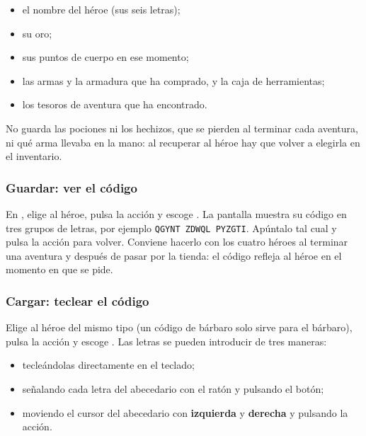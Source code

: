 \begin{itemize}
\item el nombre del héroe (sus seis letras);
\item su oro;
\item sus puntos de cuerpo en ese momento;
\item las armas y la armadura que ha comprado, y la caja de herramientas;
\item los tesoros de aventura que ha encontrado.
\end{itemize}

No guarda las pociones ni los hechizos, que se pierden al terminar cada
aventura, ni qué arma llevaba en la mano: al recuperar al héroe hay que
volver a elegirla en el inventario.


\subsubsection*{Guardar: ver el código}

En , elige al héroe, pulsa la acción y escoge
. La pantalla muestra su código en tres grupos de letras,
por ejemplo \texttt{QGYNT ZDWQL PYZGTI}. Apúntalo tal cual y pulsa la acción
para volver. Conviene hacerlo con los cuatro héroes al terminar una aventura
y después de pasar por la tienda: el código refleja al héroe en el momento
en que se pide.

\subsubsection*{Cargar: teclear el código}

Elige al héroe del mismo tipo (un código de bárbaro solo sirve para el
bárbaro), pulsa la acción y escoge . Las letras se pueden
introducir de tres maneras:

\begin{itemize}
\item tecleándolas directamente en el teclado;
\item señalando cada letra del abecedario con el ratón y pulsando el botón;
\item moviendo el cursor del abecedario con \textbf{izquierda} y
  \textbf{derecha} y pulsando la acción.
\end{itemize}


